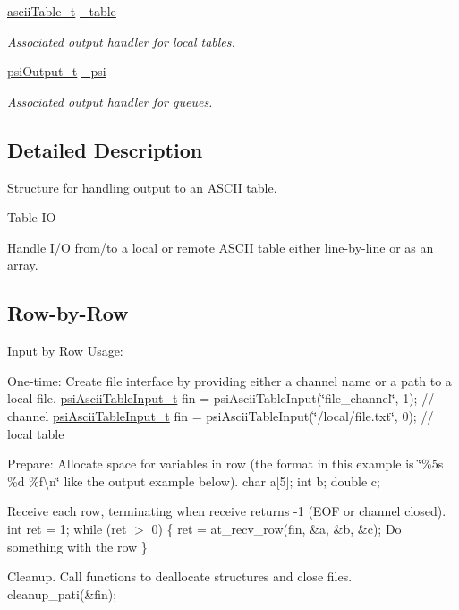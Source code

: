 \begin{DoxyCompactItemize}
\mbox{\label{structpsiAsciiTableOutput__t_aa2c3f77a38c5907c9a4bf37d9483e12f}} 
\hyperlink{structasciiTable__t}{ascii\+Table\+\_\+t} \hyperlink{structpsiAsciiTableOutput__t_aa2c3f77a38c5907c9a4bf37d9483e12f}{\+\_\+table}
\begin{DoxyCompactList}\small\item\em Associated output handler for local tables. \end{DoxyCompactList}\item 
\mbox{\label{structpsiAsciiTableOutput__t_a6d499326c0db9a9d50e55dd5c0147141}} 
\hyperlink{structpsiOutput__t}{psi\+Output\+\_\+t} \hyperlink{structpsiAsciiTableOutput__t_a6d499326c0db9a9d50e55dd5c0147141}{\+\_\+psi}
\begin{DoxyCompactList}\small\item\em Associated output handler for queues. \end{DoxyCompactList}\end{DoxyCompactItemize}


\subsection{Detailed Description}
Structure for handling output to an A\+S\+C\+II table. 

Table IO

Handle I/O from/to a local or remote A\+S\+C\+II table either line-\/by-\/line or as an array.

\subsection*{Row-\/by-\/\+Row }

Input by Row Usage\+:
\begin{DoxyEnumerate}
\item One-\/time\+: Create file interface by providing either a channel name or a path to a local file. \hyperlink{structpsiAsciiTableInput__t}{psi\+Ascii\+Table\+Input\+\_\+t} fin = psi\+Ascii\+Table\+Input(\char`\"{}file\+\_\+channel\char`\"{}, 1); // channel \hyperlink{structpsiAsciiTableInput__t}{psi\+Ascii\+Table\+Input\+\_\+t} fin = psi\+Ascii\+Table\+Input(\char`\"{}/local/file.\+txt\char`\"{}, 0); // local table
\item Prepare\+: Allocate space for variables in row (the format in this example is \char`\"{}\%5s \%d \%f\textbackslash{}n\char`\"{} like the output example below). char a\mbox{[}5\mbox{]}; int b; double c;
\item Receive each row, terminating when receive returns -\/1 (E\+OF or channel closed). int ret = 1; while (ret $>$ 0) \{ ret = at\+\_\+recv\+\_\+row(fin, \&a, \&b, \&c); Do something with the row \}
\item Cleanup. Call functions to deallocate structures and close files. cleanup\+\_\+pati(\&fin);
\end{DoxyEnumerate}

